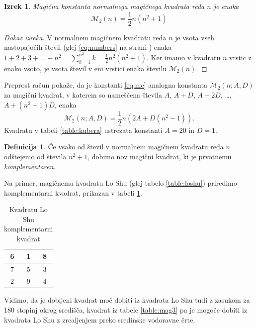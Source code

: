 \documentclass[a4paper,12pt]{article}
\theoremstyle{definition}
\newtheorem{definicija}{Definicija}
\theoremstyle{plain}
\newtheorem{izrek}{Izrek}
\newcommand{\m}{\mathcal{M}_2}
\newcommand{\pojem}[1]{\emph{\color{purple}#1}}
\newenvironment{magic}[3]{
   \begin{table}[!ht]
   \centering
   \caption{#2}
   \label{#3}
   \large
   \begin{tabular}{|*{#1}{c|}} \hline
}{
 \end{tabular}
   \normalsize
\end{table}  
}
\begin{document}

  
  \begin{izrek}
    Magična konstanta normalnega magičnega kvadrata reda $n$
    je enaka
    \begin{equation}
       \m(n) = \frac{1}{2} n(n^2+1)
       \label{eq:mc}
    \end{equation}
  \end{izrek}


   
   \begin{proof}[Dokaz izreka]
      V normalnem magičnem kvadratu reda $n$ je vsota vseh nastopajočih
      števil (glej \eqref{eq:numbers} na strani \pageref{eq:numbers}) enaka
      $1+2+3+\dots+n^2=\sum_{k=1}^{n^2}k=\frac{1}{2}n^2(n^2+1)$. Ker imamo
      v kvadratu $n$ vrstic z enako vsoto, je vsota števil v eni vrstici
      enaka številu $\m(n)$.
   \end{proof}

Preprost račun pokaže, da je konstanti \eqref{eq:mc} analogna konstanta
$\m(n;A,D)$ za magični kvadrat, v katerem so nameščena števila
$A$, $A+D$, $A+2D$, \dots, $A+(n^2-1)D$, enaka %
$$\mathcal{M}_2(n;A,D)=\frac{1}{2}n \left(2A + D(n^2 - 1) \right).$$
Kvadratu v tabeli \ref{table:kubera} ustrezata konstanti $A=20$ in $D=1$.

\begin{definicija}
      Če vsako od števil v normalnem magičnem kvadratu reda $n$ odštejemo
      od števila $n^2+1$, dobimo nov magični kvadrat, ki je prvotnemu
      \pojem{komplementaren}.
\end{definicija}

Na primer, magičnemu kvadratu Lo Shu (glej tabelo \ref{table:loshu}) priredimo
komplementarni kvadrat, prikazan v tabeli \ref{ttable:closhu}.
%

\begin{magic}{3}{Kvadratu Lo Shu komplementarni kvadrat}{ttable:closhu}
      6 & 1 & 8 \\\hline
      7 & 5 & 3 \\\hline
      2 & 9 & 4 \\\hline
\end{magic}

Vidimo, da je dobljeni kvadrat moč dobiti iz kvadrata Lo Shu tudi z zasukom za
180 stopinj okrog središča, kvadrat iz tabele \ref{table:mag3} pa je mogoče dobiti
iz kvadrata Lo Shu z zrcaljenjem preko sredinske vodoravne črte.
\end{document}

